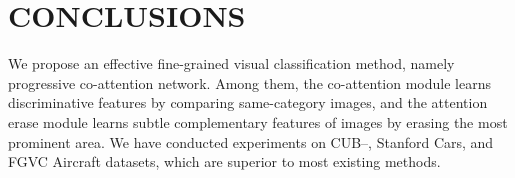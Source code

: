\documentclass[conference]{IEEEtran}
\begin{document}
\section{CONCLUSIONS}
We propose an effective fine-grained visual classification method, namely progressive co-attention network. Among them, the co-attention module learns discriminative features by comparing same-category images, and the attention erase module learns subtle complementary features of images by erasing the most prominent area. We have conducted experiments on CUB--, Stanford Cars, and FGVC Aircraft datasets, which are superior to most existing methods. 

\vspace*{0.1in}



\end{document}
